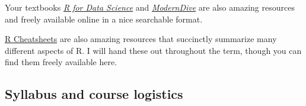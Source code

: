 \documentclass[
]{article}
\begin{document}
Your textbooks \href{https://r4ds.hadley.nz/}{\emph{R for Data Science}}
and \href{https://moderndive.com/v2/index.html}{\emph{ModernDive}} are
also amazing resources and freely available online in a nice searchable
format.

\href{https://posit.co/resources/cheatsheets/}{R Cheatsheets} are also
amazing resources that succinctly summarize many different aspects of R.
I will hand these out throughout the term, though you can find them
freely available here.

\hypertarget{syllabus-and-course-logistics}{%
\subsection{Syllabus and course
logistics}\label{syllabus-and-course-logistics}}
\end{document}
